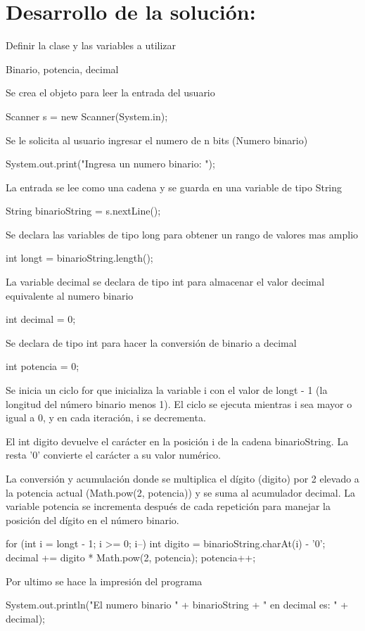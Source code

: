 \documentclass{IEEEcsmag}
\begin{document}
\section*{Desarrollo de la solución:}
Definir la clase y las variables a utilizar
\begin{javaCode}
Binario, potencia, decimal 
\end{javaCode}
Se crea el objeto para leer la entrada del usuario
\begin{javaCode}
	Scanner s = new Scanner(System.in);
\end{javaCode}
Se le solicita al usuario ingresar el numero de n bits (Numero binario) 
\begin{javaCode}
	System.out.print("Ingresa un numero binario: ");
\end{javaCode}
La entrada se lee como una cadena y se guarda en una variable de tipo String
\begin{javaCode}
	String binarioString = s.nextLine();
\end{javaCode}
Se declara las variables de tipo long para obtener un rango de valores mas amplio
\begin{javaCode}
	int longt = binarioString.length();
\end{javaCode}
La variable decimal se declara de tipo int para almacenar el valor decimal equivalente al numero binario
\begin{javaCode}	
	int decimal = 0;
\end{javaCode}
Se declara de tipo int para hacer la conversión de binario a decimal 
\begin{javaCode}
	int potencia = 0;
\end{javaCode}
Se inicia un ciclo for que inicializa la variable i con el valor de longt - 1 (la longitud del número binario menos 1). El ciclo se ejecuta mientras i sea mayor o igual a 0, y en cada iteración, i se decrementa.

El int digito devuelve el carácter en la posición i de la cadena binarioString. La resta '0' convierte el carácter a su valor numérico.

La conversión y acumulación donde se multiplica el dígito (digito) por 2 elevado a la potencia actual (Math.pow(2, potencia)) y se suma al acumulador decimal. La variable potencia se incrementa después de cada repetición para manejar la posición del dígito en el número binario.
 \begin{javaCode}
for (int i = longt - 1; i >= 0; i--) {
	int digito = binarioString.charAt(i) - '0';
	decimal += digito * Math.pow(2, potencia);
	potencia++;
}
\end{javaCode}
Por ultimo se hace la impresión del programa 
\begin{javaCode}
 System.out.println("El numero binario " + binarioString + " en decimal es: " + decimal);
\end{javaCode}
\end{document}
